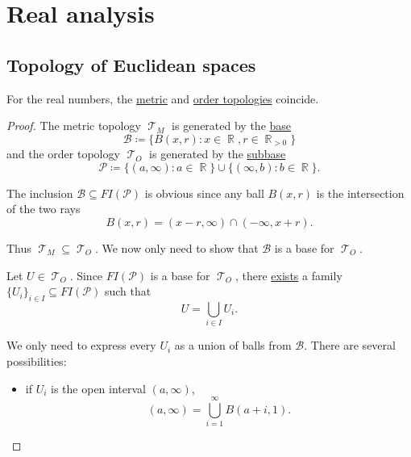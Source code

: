 \section{Real analysis}\label{sec:real_analysis}
\subsection{Topology of Euclidean spaces}\label{subsec:real_vector_space_geometry}

\begin{theorem}\label{thm:real_metric_and_order_topologies_coincide}
  For the real numbers, the \hyperref[def:metric_topology]{metric} and \hyperref[def:order_topology]{order topologies} coincide.
\end{theorem}
\begin{proof}
  The metric topology \( \mscrT_M \) is generated by the \hyperref[def:topological_base]{base}
  \begin{equation*}
    \mathcal{B} \coloneqq \{ B(x, r) \colon x \in \BbbR, r \in \BbbR_{>0} \}
  \end{equation*}
  and the order topology \( \mscrT_O \) is generated by the \hyperref[def:topological_subbase]{subbase}
  \begin{equation*}
    \mathcal{P} \coloneqq \{ (a, \infty) \colon a \in \BbbR \} \cup \{ (\infty, b) \colon b \in \BbbR \}.
  \end{equation*}

  The inclusion \( \mathcal{B} \subseteq FI(\mathcal{P}) \) is obvious since any ball \( B(x, r) \) is the intersection of the two rays
  \begin{equation*}
    B(x, r) = (x - r, \infty) \cap (-\infty, x + r).
  \end{equation*}

  Thus \( \mscrT_M \subseteq \mscrT_O \). We now only need to show that \( \mathcal{B} \) is a base for \( \mscrT_O \).

  Let \( U \in \mscrT_O \). Since \( FI(\mathcal{P}) \) is a base for \( \mscrT_O \), there \hyperref[def:topological_base/union]{exists} a family \( \{ U_i \}_{i \in I} \subseteq FI(\mathcal{P}) \) such that
  \begin{equation*}
    U = \bigcup_{i \in I} U_i.
  \end{equation*}

  We only need to express every \( U_i \) as a union of balls from \( \mathcal{B} \). There are several possibilities:
  \begin{itemize}
    \item if \( U_i \) is the open interval \( (a, \infty) \),
          \begin{equation*}
            (a, \infty) = \bigcup_{i=1}^\infty B(a + i, 1).
          \end{equation*}


\end{itemize}
\end{proof}
